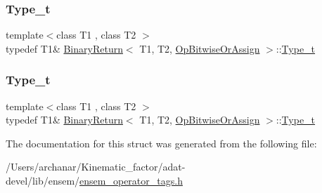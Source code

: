 \mbox{\label{structBinaryReturn_3_01T1_00_01T2_00_01OpBitwiseOrAssign_01_4_a256f1f50cdbaf032fbed109888ad5bfc}} 
\subsubsection{\texorpdfstring{Type\_t}{Type\_t}\hspace{0.1cm}{\footnotesize\ttfamily [2/3]}}
{\footnotesize\ttfamily template$<$class T1 , class T2 $>$ \\
typedef T1\& \mbox{\hyperlink{structBinaryReturn}{Binary\+Return}}$<$ T1, T2, \mbox{\hyperlink{structOpBitwiseOrAssign}{Op\+Bitwise\+Or\+Assign}} $>$\+::\mbox{\hyperlink{structBinaryReturn_3_01T1_00_01T2_00_01OpBitwiseOrAssign_01_4_a256f1f50cdbaf032fbed109888ad5bfc}{Type\+\_\+t}}}

\mbox{\label{structBinaryReturn_3_01T1_00_01T2_00_01OpBitwiseOrAssign_01_4_a256f1f50cdbaf032fbed109888ad5bfc}} 
\subsubsection{\texorpdfstring{Type\_t}{Type\_t}\hspace{0.1cm}{\footnotesize\ttfamily [3/3]}}
{\footnotesize\ttfamily template$<$class T1 , class T2 $>$ \\
typedef T1\& \mbox{\hyperlink{structBinaryReturn}{Binary\+Return}}$<$ T1, T2, \mbox{\hyperlink{structOpBitwiseOrAssign}{Op\+Bitwise\+Or\+Assign}} $>$\+::\mbox{\hyperlink{structBinaryReturn_3_01T1_00_01T2_00_01OpBitwiseOrAssign_01_4_a256f1f50cdbaf032fbed109888ad5bfc}{Type\+\_\+t}}}



The documentation for this struct was generated from the following file\+:\begin{DoxyCompactItemize}
\item 
/\+Users/archanar/\+Kinematic\+\_\+factor/adat-\/devel/lib/ensem/\mbox{\hyperlink{adat-devel_2lib_2ensem_2ensem__operator__tags_8h}{ensem\+\_\+operator\+\_\+tags.\+h}}\end{DoxyCompactItemize}

